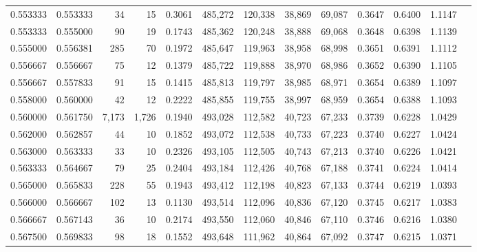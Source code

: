 \begin{tabular}{rrrrrrrrrrrrr}
0.553333 & 0.553333 &     34 &    15 &                                     0.3061 & 485,272 & 120,338 &  38,869 &  69,087 & 0.3647 & 0.6400 & 1.1147 \\
0.553333 & 0.555000 &     90 &    19 &                                     0.1743 & 485,362 & 120,248 &  38,888 &  69,068 & 0.3648 & 0.6398 & 1.1139 \\
0.555000 & 0.556381 &    285 &    70 &                                     0.1972 & 485,647 & 119,963 &  38,958 &  68,998 & 0.3651 & 0.6391 & 1.1112 \\
0.556667 & 0.556667 &     75 &    12 &                                     0.1379 & 485,722 & 119,888 &  38,970 &  68,986 & 0.3652 & 0.6390 & 1.1105 \\
0.556667 & 0.557833 &     91 &    15 &                                     0.1415 & 485,813 & 119,797 &  38,985 &  68,971 & 0.3654 & 0.6389 & 1.1097 \\
0.558000 & 0.560000 &     42 &    12 &                                     0.2222 & 485,855 & 119,755 &  38,997 &  68,959 & 0.3654 & 0.6388 & 1.1093 \\
0.560000 & 0.561750 &  7,173 & 1,726 &                                     0.1940 & 493,028 & 112,582 &  40,723 &  67,233 & 0.3739 & 0.6228 & 1.0429 \\
0.562000 & 0.562857 &     44 &    10 &                                     0.1852 & 493,072 & 112,538 &  40,733 &  67,223 & 0.3740 & 0.6227 & 1.0424 \\
0.563000 & 0.563333 &     33 &    10 &                                     0.2326 & 493,105 & 112,505 &  40,743 &  67,213 & 0.3740 & 0.6226 & 1.0421 \\
0.563333 & 0.564667 &     79 &    25 &                                     0.2404 & 493,184 & 112,426 &  40,768 &  67,188 & 0.3741 & 0.6224 & 1.0414 \\
0.565000 & 0.565833 &    228 &    55 &                                     0.1943 & 493,412 & 112,198 &  40,823 &  67,133 & 0.3744 & 0.6219 & 1.0393 \\
0.566000 & 0.566667 &    102 &    13 &                                     0.1130 & 493,514 & 112,096 &  40,836 &  67,120 & 0.3745 & 0.6217 & 1.0383 \\
0.566667 & 0.567143 &     36 &    10 &                                     0.2174 & 493,550 & 112,060 &  40,846 &  67,110 & 0.3746 & 0.6216 & 1.0380 \\
0.567500 & 0.569833 &     98 &    18 &                                     0.1552 & 493,648 & 111,962 &  40,864 &  67,092 & 0.3747 & 0.6215 & 1.0371 \\

\end{tabular}
